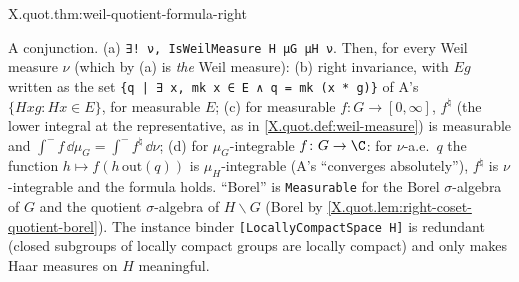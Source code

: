 \begin{tfformal}{X.quot.thm:weil-quotient-formula-right}
\begin{tffidelity}
A conjunction. (a) \texttt{∃! ν, IsWeilMeasure H μG μH ν}. Then, for every Weil measure $\nu$ (which by (a) is \emph{the} Weil measure): (b) right invariance, with $Eg$ written as the set \texttt{\{q | ∃ x, mk x ∈ E ∧ q = mk (x * g)\}} of A's $\{Hxg:Hx\in E\}$, for measurable $E$; (c) for measurable $f\colon G\to[0,\infty]$, $f^\natural$ (the lower integral at the representative, as in \cref{X.quot.def:weil-measure}) is measurable and $\int^-f\,\dd\mu_G=\int^-f^\natural\,\dd\nu$; (d) for $\mu_G$-integrable $f\colon G\to\C$: for $\nu$-a.e.\ $q$ the function $h\mapsto f(h\,\mathrm{out}(q))$ is $\mu_H$-integrable (A's ``converges absolutely''), $f^\natural$ is $\nu$-integrable and the formula holds. ``Borel'' is \texttt{Measurable} for the Borel $\sigma$-algebra of $G$ and the quotient $\sigma$-algebra of $H\backslash G$ (Borel by \cref{X.quot.lem:right-coset-quotient-borel}). The instance binder \texttt{[LocallyCompactSpace H]} is redundant (closed subgroups of locally compact groups are locally compact) and only makes Haar measures on $H$ meaningful.
\end{tffidelity}
\end{tfformal}
